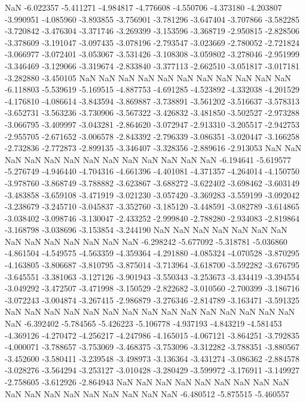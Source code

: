 NaN
-6.022357
-5.411271
-4.984817
-4.776608
-4.550706
-4.373180
-4.203807
-3.990951
-4.085960
-3.893855
-3.756901
-3.781296
-3.647404
-3.707866
-3.582285
-3.720842
-3.476304
-3.371746
-3.269399
-3.153596
-3.368719
-2.950815
-2.828506
-3.378609
-3.191047
-3.097435
-3.078196
-2.793547
-3.023669
-2.780052
-2.721824
-3.066977
-3.072401
-3.053067
-3.531426
-3.108308
-3.059802
-3.278046
-2.951999
-3.346469
-3.129066
-3.319674
-2.833840
-3.377113
-2.662510
-3.051817
-3.017181
-3.282880
-3.450105
NaN
NaN
NaN
NaN
NaN
NaN
NaN
NaN
NaN
NaN
NaN
-6.118803
-5.539619
-5.169515
-4.887753
-4.691285
-4.523892
-4.332038
-4.201529
-4.176810
-4.086614
-3.843594
-3.869887
-3.738891
-3.561202
-3.516637
-3.578313
-3.652731
-3.563236
-3.730906
-3.567322
-3.426832
-3.481850
-3.502527
-2.973288
-3.066795
-3.409997
-3.043281
-2.864620
-3.072947
-2.913310
-3.205517
-2.942753
-2.955705
-2.671652
-3.006578
-2.843392
-2.796339
-3.086351
-3.020447
-3.166258
-2.732836
-2.772873
-2.899135
-3.346407
-3.328356
-2.889616
-2.913053
NaN
NaN
NaN
NaN
NaN
NaN
NaN
NaN
NaN
NaN
NaN
NaN
NaN
-6.194641
-5.619577
-5.276749
-4.946440
-4.704316
-4.661396
-4.401081
-4.371357
-4.264014
-4.150750
-3.978760
-3.868749
-3.788882
-3.623867
-3.688272
-3.622402
-3.698462
-3.603149
-3.483858
-3.659108
-3.471919
-3.021230
-3.057420
-3.369283
-3.559199
-3.092042
-3.238679
-3.245710
-3.045837
-3.352760
-3.185120
-3.448591
-3.082789
-3.614865
-3.038402
-3.098746
-3.130047
-2.433252
-2.999840
-2.788280
-2.934083
-2.819864
-3.168798
-3.038696
-3.153854
-3.244190
NaN
NaN
NaN
NaN
NaN
NaN
NaN
NaN
NaN
NaN
NaN
NaN
NaN
NaN
-6.298242
-5.677092
-5.318781
-5.036860
-4.861504
-4.549575
-4.563359
-4.359364
-4.291880
-4.085324
-4.070528
-3.870295
-4.163805
-3.806687
-3.810795
-3.875014
-3.713964
-3.618700
-3.592282
-3.676795
-3.645551
-3.381063
-3.127126
-3.901943
-3.550343
-3.253673
-3.434419
-3.394554
-3.049292
-3.472507
-3.471998
-3.150529
-2.822682
-3.010560
-2.700399
-3.186716
-3.072243
-3.004874
-3.267415
-2.986879
-3.276346
-2.814789
-3.163471
-3.591325
NaN
NaN
NaN
NaN
NaN
NaN
NaN
NaN
NaN
NaN
NaN
NaN
NaN
NaN
NaN
NaN
-6.392402
-5.784565
-5.426223
-5.106778
-4.937193
-4.843219
-4.581453
-4.369126
-4.270472
-4.256217
-4.247986
-4.165015
-4.067121
-3.864251
-3.792835
-4.000071
-3.788657
-3.753069
-3.468375
-3.753096
-3.312282
-3.788351
-3.880567
-3.452600
-3.580411
-3.239548
-3.498973
-3.136364
-3.431274
-3.086362
-2.884578
-3.028276
-3.564294
-3.253127
-3.010428
-3.280429
-3.599972
-3.176911
-3.149927
-2.758605
-3.612926
-2.864943
NaN
NaN
NaN
NaN
NaN
NaN
NaN
NaN
NaN
NaN
NaN
NaN
NaN
NaN
NaN
NaN
NaN
NaN
-6.480512
-5.875515
-5.460557
